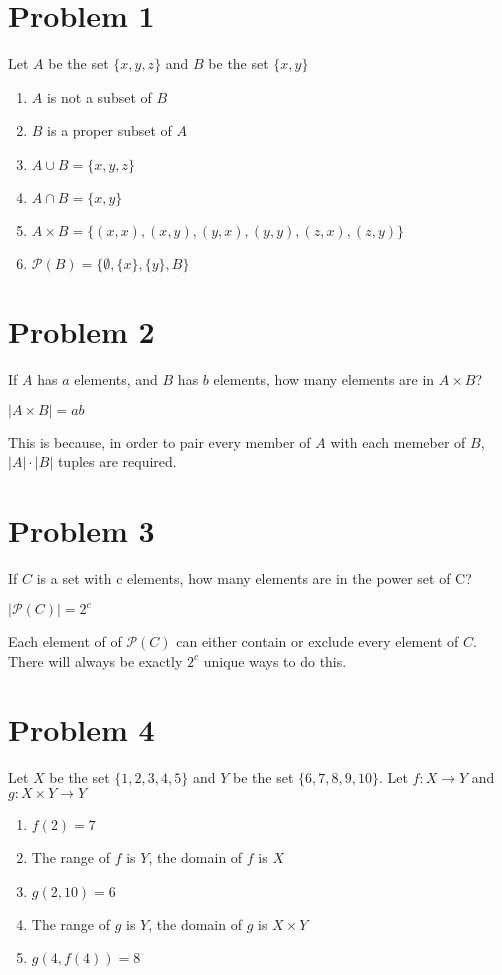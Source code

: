 \documentclass{article}
\newenvironment{problem}[1]{
  \nobreak\section*{Problem #1}
}{}
\begin{document}
  \begin{problem}{1}
    Let $A$ be the set $\{x, y, z\}$ and $B$ be the set $\{x, y\}$

    \begin{enumerate}
      \item $A$ is not a subset of $B$
      \item $B$ is a proper subset of $A$
      \item $A \cup B = \{x, y, z\}$
      \item $A \cap B = \{x, y\}$
      \item $A \times B = \{(x, x), (x, y), (y, x), (y, y), (z, x), (z, y)\}$
      \item $\mathcal{P}(B) = \{\emptyset, \{x\}, \{y\}, B\}$
    \end{enumerate}
  \end{problem}

  \begin{problem}{2}
    If $A$ has $a$ elements, and $B$ has $b$ elements, how many 
    elements are in $A \times B$?

    \begin{center}
      $|A \times B| = ab$
    \end{center}

    \noindent
    This is because, in order to pair every member of $A$ with
    each memeber of $B$, $|A|\cdot|B|$ tuples are required.
  \end{problem}

  \begin{problem}{3}
    If $C$ is a set with c elements, how many elements are in 
    the power set of C?

    \begin{center}
      $|\mathcal{P}(C)| = 2^{c}$
    \end{center}

    \noindent
    Each element of of $\mathcal{P}(C)$ can either contain or
    exclude every element of $C$.  There will always be exactly
    $2^{c}$ unique ways to do this.
  \end{problem}

  \begin{problem}{4}
    Let $X$ be the set $\{1, 2, 3, 4, 5\}$ and $Y$ be the set
    $\{6, 7, 8, 9, 10\}$.  Let $f : X \to Y$ and $g : X \times Y \to Y$

    \begin{enumerate}
      \item $f(2) = 7$
      \item The range of $f$ is $Y$, the domain of $f$ is $X$
      \item $g(2, 10) = 6$
      \item The range of $g$ is $Y$, the domain of $g$ is $X \times Y$
      \item $g(4, f(4)) = 8$
    \end{enumerate}
  \end{problem}
\end{document}

